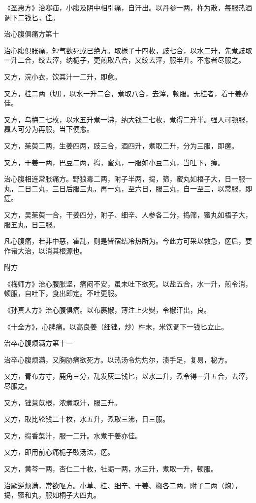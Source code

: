 \documentclass[12pt,UTF8]{ctexbook}
\begin{document}
《圣惠方》治寒疝，小腹及阴中相引痛，自汗出。以丹参一两，杵为散，每服热酒调下二钱匕，佳。

治心腹俱痛方第十

治心腹俱胀痛，短气欲死或已绝方。取栀子十四枚，豉七合，以水二升，先煮豉取一升二合，绞去滓，纳栀子，更煎取八合，又绞去滓，服半升。不愈者尽服之。

又方，浣小衣，饮其汁一二升，即愈。

又方，桂二两（切），以水一升二合，煮取八合，去滓，顿服。无桂者，着干姜亦佳。

又方，乌梅二七枚，以水五升煮一沸，纳大钱二七枚，煮得二升半。强人可顿服，羸人可分为再服，当下便愈。

又方，茱萸二两，生姜四两，豉三合，酒四升，煮取二升，分为三服，即瘥。

又方，干姜一两，巴豆二两，捣，蜜丸，一服如小豆二丸，当吐下，瘥。

治心腹相连常胀痛方。野狼毒二两，附子半两，捣，筛，蜜丸如梧子大，日一服一丸，二日二丸，三日后服三丸，再一丸，至六日，服三丸，自一至三，以常服，即瘥。

又方，吴茱萸一合，干姜四分，附子、细辛、人参各二分，捣筛，蜜丸如梧子大，服五丸，日三服。

凡心腹痛，若非中恶，霍乱，则是皆宿结冷热所为。今此方可采以救急，瘥后，要作诸大治，以消其根源也。

附方

《梅师方》治心腹胀坚，痛闷不安，虽未吐下欲死。以盐五合，水一升，煎令消，顿服，自吐下，食出即定。不吐更服。

《孙真人方》治心腹俱痛。以布裹椒，薄注上火熨，令椒汗出，良。

《十全方》，心脾痛。以高良姜（细锉，炒）杵末，米饮调下一钱匕立止。

治卒心腹烦满方第十一

治卒心腹烦满，又胸胁痛欲死方。以热汤令灼灼尔，渍手足，复易，秘方。

又方，青布方寸，鹿角三分，乱发灰二钱匕，以水二升，煮令得一升五合，去滓，尽服之。

又方，锉薏苡根，浓煮取汁，服三升。

又方，取比轮钱二十枚，水五升，煮取三沸，日三服。

又方，捣香菜汁，服一二升。水煮干姜亦佳。

又方，即用前心痛栀子豉汤法，瘥。

又方，黄芩一两，杏仁二十枚，牡蛎一两，水三升，煮取一升，顿服。

治厥逆烦满，常欲呕方。小草、桂、细辛、干姜、椒各二两，附子二两（炮），捣，蜜和丸，服如桐子大四丸。
\end{document}

